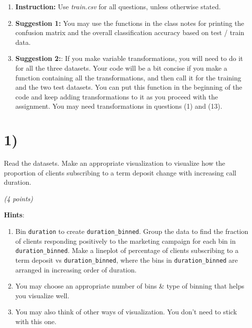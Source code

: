 \documentclass[
  letterpaper,
  DIV=11,
  numbers=noendperiod]{scrreprt}
\begin{document}

\begin{enumerate}
\def\labelenumi{(\arabic{enumi})}
\item
  \textbf{Instruction:} Use \emph{train.csv} for all questions, unless
  otherwise stated.
\item
  \textbf{Suggestion 1:} You may use the functions in the class notes
  for printing the confusion matrix and the overall classification
  accuracy based on test / train data.
\item
  \textbf{Suggestion 2:}: If you make variable transformations, you will
  need to do it for all the three datasets. Your code will be a bit
  concise if you make a function containing all the transformations, and
  then call it for the training and the two test datasets. You can put
  this function in the beginning of the code and keep adding
  transformations to it as you proceed with the assignment. You may need
  transformations in questions (1) and (13).
\end{enumerate}

\section{1)}\label{section}

Read the datasets. Make an appropriate visualization to visualize how
the proportion of clients subscribing to a term deposit change with
increasing call duration.

\emph{(4 points)}

\textbf{Hints}:

\begin{enumerate}
\def\labelenumi{\arabic{enumi}.}
\item
  Bin \texttt{duration} to create \texttt{duration\_binned}. Group the
  data to find the fraction of clients responding positively to the
  marketing campaign for each bin in \texttt{duration\_binned}. Make a
  lineplot of percentage of clients subscribing to a term deposit vs
  \texttt{duration\_binned}, where the bins in \texttt{duration\_binned}
  are arranged in increasing order of duration.
\item
  You may choose an appropriate number of bins \& type of binning that
  helps you visualize well.
\item
  You may also think of other ways of visualization. You don't need to
  stick with this one.
\end{enumerate}
\end{document}

